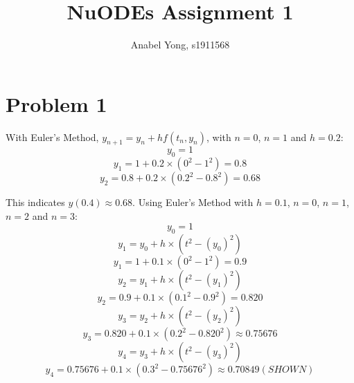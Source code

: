 \documentclass{article}
\date{\vspace{-5ex}}
\title{NuODEs Assignment 1}
\author{Anabel Yong, s1911568}
\begin{document}
\maketitle



\section{Problem 1}

With Euler's Method, $y_{n+1}=y_n + hf(t_n,y_n)$, with $n=0$, $n=1$ and $h=0.2$:
\begin{equation*}
    y_0 = 1 
\end{equation*}
\begin{equation*}
    y_1 = 1 + 0.2 \times (0^2-1^2)= 0.8
\end{equation*}
\begin{equation*}
    y_2 = 0.8 + 0.2 \times (0.2^2-0.8^2) = 0.68
\end{equation*}

This indicates $y(0.4) \approx 0.68$. 
Using Euler's Method with $h=0.1$, $n=0$, $n=1$, $n=2$ and $n=3$:
\begin{equation*}
    y_0 = 1 
\end{equation*}
\begin{equation*}
    y_1 = y_0+ h \times (t^2-(y_0)^2)
\end{equation*}
\begin{equation*}
    y_1 = 1 + 0.1 \times (0^2-1^2)= 0.9
\end{equation*}
\begin{equation*}
    y_2 = y_1+ h \times (t^2-(y_1)^2)
\end{equation*}
\begin{equation*}
    y_2 = 0.9 + 0.1 \times (0.1^2-0.9^2) = 0.820
\end{equation*}
\begin{equation*}
    y_3 = y_2+ h \times (t^2-(y_2)^2)
\end{equation*}
\begin{equation*}
    y_3 = 0.820 + 0.1 \times (0.2^2-0.820^2) \approx 0.75676
\end{equation*}
\begin{equation*}
    y_4 = y_3+ h \times (t^2-(y_3)^2)
\end{equation*}
\begin{equation*}
    y_4 = 0.75676 + 0.1 \times (0.3^2-0.75676^2) \approx 0.70849 (SHOWN)
\end{equation*}
\end{document}

